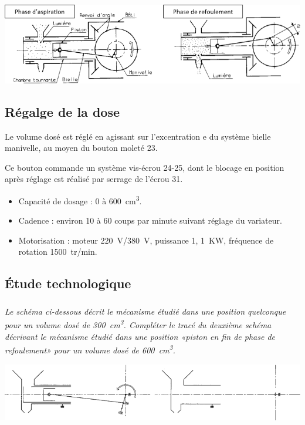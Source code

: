 \begin{multicols}{2}
\begin{multicols}{2}
\begin{center}
\includegraphics[width=\linewidth]{images/fig_07}
\end{center}




\subsection*{Régalge de la dose}
Le volume dosé est réglé en agissant sur l’excentration e du système bielle manivelle, au moyen du bouton moleté 23.

Ce bouton commande un système vis-écrou 24-25, dont le blocage en position après réglage est réalisé par serrage de l’écrou 31.


\begin{itemize}
\item Capacité de dosage : 0 à \SI{600}{cm^3}.
\item Cadence : environ 10 à 60 coups par minute suivant réglage du variateur.
\item Motorisation : moteur \SI{220}{V}/\SI{380}{V}, puissance 1, \SI{1}{KW}, fréquence de rotation \SI{1500}{tr/min}.
\end{itemize}
\subsection*{Étude technologique}

\subparagraph{}\textit{Le schéma ci-dessous décrit le mécanisme étudié dans une position quelconque pour un volume dosé de \SI{300}{cm^3}. Compléter le tracé du deuxième schéma décrivant le mécanisme étudié dans une position «piston en fin de phase de refoulement» pour un volume dosé de \SI{600}{cm^3}.}

\begin{center}
\includegraphics[width=\linewidth]{images/fig_08}
\end{center}



\end{multicols}
\end{multicols}

